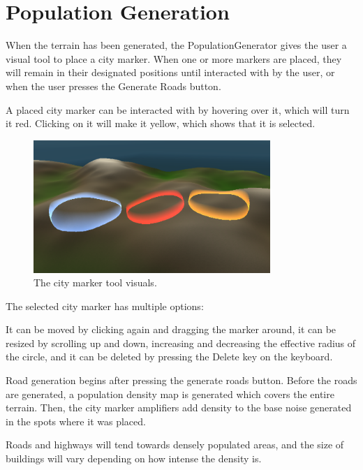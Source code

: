 \section{Population Generation}

When the terrain has been generated, the PopulationGenerator gives the user a visual tool to place a city marker.
When one or more markers are placed, they will remain in their designated positions until interacted with by the user, or when the user presses the Generate Roads button.

A placed city marker can be interacted with by hovering over it, which will turn it red.
Clicking on it will make it yellow, which shows that it is selected. 

\begin{figure}[h!]
  \centering

  \includegraphics[width=0.8\textwidth]{figure/citymarkers.png}
  \caption{The city marker tool visuals. }

  \label{fig:citymarkers}
\end{figure}

The selected city marker has multiple options:

It can be moved by clicking again and dragging the marker around,
it can be resized by scrolling up and down, increasing and decreasing the effective radius of the circle,
and it can be deleted by pressing the Delete key on the keyboard.

Road generation begins after pressing the generate roads button.
Before the roads are generated, a population density map is generated which covers the entire terrain.
Then, the city marker amplifiers add density to the base noise generated in the spots where it was placed.

Roads and highways will tend towards densely populated areas, and the size of buildings will vary depending on how intense the density is.
